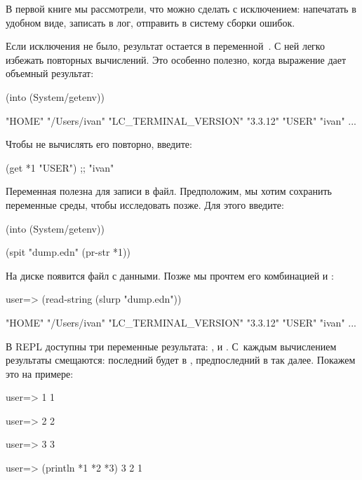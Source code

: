 В первой книге мы рассмотрели, что можно сделать с исключением: напечатать в удобном виде, записать в лог, отправить в систему сборки ошибок.

Если исключения не было, результат остается в переменной~. С ней легко избежать повторных вычислений. Это особенно полезно, когда выражение дает объемный результат:

\begin{english}
  \begin{clojure}
(into {} (System/getenv))

{"HOME" "/Users/ivan"
 "LC_TERMINAL_VERSION" "3.3.12"
 "USER" "ivan"
 ...}
  \end{clojure}
\end{english}

Чтобы не вычислять его повторно, введите:

\begin{english}
  \begin{clojure}
(get *1 "USER")
;; "ivan"
  \end{clojure}
\end{english}

Переменная  полезна для записи в файл. Предположим, мы хотим сохранить переменные среды, чтобы исследовать позже. Для этого введите:

\begin{english}
  \begin{clojure}
(into {} (System/getenv))

(spit "dump.edn" (pr-str *1))
  \end{clojure}
\end{english}

На диске появится файл  с данными. Позже мы прочтем его комбинацией  и :

\begin{english}
  \begin{clojure}
user=> (read-string (slurp "dump.edn"))

{"HOME" "/Users/ivan"
 "LC_TERMINAL_VERSION" "3.3.12"
 "USER" "ivan"
 ...}
  \end{clojure}
\end{english}

В REPL доступны три переменные результата: ,  и . С~каждым вычислением результаты смещаются: последний будет в , предпоследний в  так далее. Покажем это на примере:

\begin{english}
  \begin{clojure}
user=> 1
1

user=> 2
2

user=> 3
3

user=> (println *1 *2 *3)
3 2 1
  \end{clojure}
\end{english}

